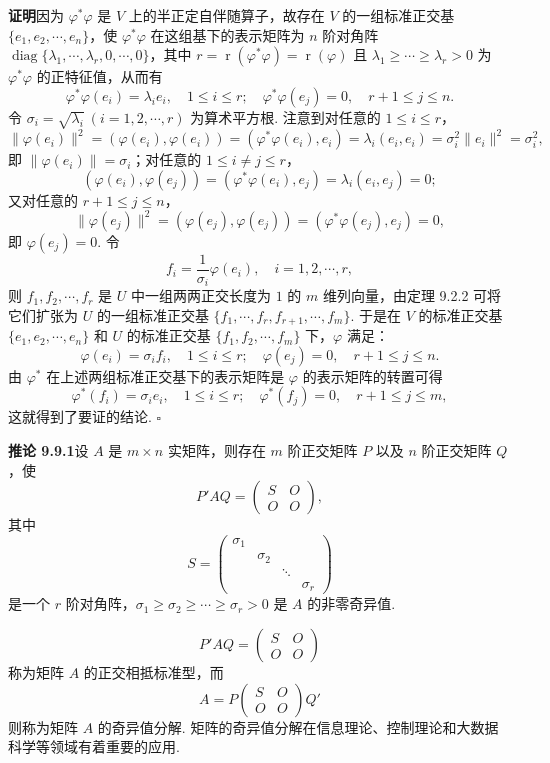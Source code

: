 \documentclass[UTF8,12pt,a4paper,fontset=fandol]{ctexart}
\begin{document}
\noindent\textbf{证明}\quad 因为 $\varphi^*\varphi$ 是 $V$ 上的半正定自伴随算子，故存在 $V$ 的一组标准正交基 $\{e_1,e_2,\cdots,e_n\}$，使 $\varphi^*\varphi$ 在这组基下的表示矩阵为 $n$ 阶对角阵 $\operatorname{diag}\{\lambda_1,\cdots,\lambda_r,0,\cdots,0\}$，其中 $r=\operatorname{r}(\varphi^*\varphi)=\operatorname{r}(\varphi)$ 且 $\lambda_1\ge\cdots\ge\lambda_r>0$ 为 $\varphi^*\varphi$ 的正特征值，从而有
\[
  \varphi^*\varphi(e_i)=\lambda_ie_i,\quad 1\le i\le r;\quad
  \varphi^*\varphi(e_j)=0,\quad r+1\le j\le n.
\]
令 $\sigma_i=\sqrt{\lambda_i}\ (i=1,2,\cdots,r)$ 为算术平方根. 注意到对任意的 $1\le i\le r$，
\[
  \|\varphi(e_i)\|^2=(\varphi(e_i),\varphi(e_i))=(\varphi^*\varphi(e_i),e_i)=\lambda_i(e_i,e_i)=\sigma_i^2\|e_i\|^2=\sigma_i^2,
\]
即 $\|\varphi(e_i)\|=\sigma_i$；对任意的 $1\le i\ne j\le r$，
\[
  (\varphi(e_i),\varphi(e_j))=(\varphi^*\varphi(e_i),e_j)=\lambda_i(e_i,e_j)=0;
\]
又对任意的 $r+1\le j\le n$，
\[
  \|\varphi(e_j)\|^2=(\varphi(e_j),\varphi(e_j))=(\varphi^*\varphi(e_j),e_j)=0,
\]
即 $\varphi(e_j)=0$. 令
\[
  f_i=\frac1{\sigma_i}\varphi(e_i),\quad i=1,2,\cdots,r,
\]
则 $f_1,f_2,\cdots,f_r$ 是 $U$ 中一组两两正交长度为 $1$ 的 $m$ 维列向量，由定理 9.2.2 可将它们扩张为 $U$ 的一组标准正交基 $\{f_1,\cdots,f_r,f_{r+1},\cdots,f_m\}$. 于是在 $V$ 的标准正交基 $\{e_1,e_2,\cdots,e_n\}$ 和 $U$ 的标准正交基 $\{f_1,f_2,\cdots,f_m\}$ 下，$\varphi$ 满足：
\[
  \varphi(e_i)=\sigma_if_i,\quad 1\le i\le r;\quad \varphi(e_j)=0,\quad r+1\le j\le n.
\]
由 $\varphi^*$ 在上述两组标准正交基下的表示矩阵是 $\varphi$ 的表示矩阵的转置可得
\[
  \varphi^*(f_i)=\sigma_ie_i,\quad 1\le i\le r;\quad \varphi^*(f_j)=0,\quad r+1\le j\le m,
\]
这就得到了要证的结论. $\square$

\noindent\textbf{推论 9.9.1}\quad 设 $A$ 是 $m\times n$ 实矩阵，则存在 $m$ 阶正交矩阵 $P$ 以及 $n$ 阶正交矩阵 $Q$，使
\[
  P'AQ=
  \left(\begin{array}{cc}
    S & O\\
    O & O
  \end{array}\right),
\]
其中
\[
  S=
  \left(\begin{array}{cccc}
    \sigma_1 & & &\\
    & \sigma_2 & &\\
    & & \ddots &\\
    & & & \sigma_r
  \end{array}\right)
\]
是一个 $r$ 阶对角阵，$\sigma_1\ge\sigma_2\ge\cdots\ge\sigma_r>0$ 是 $A$ 的非零奇异值.

\[
  P'AQ=
  \left(\begin{array}{cc}
    S & O\\
    O & O
  \end{array}\right)
\]
称为矩阵 $A$ 的正交相抵标准型，而
\[
  A=P
  \left(\begin{array}{cc}
    S & O\\
    O & O
  \end{array}\right)
  Q'
\]
则称为矩阵 $A$ 的奇异值分解. 矩阵的奇异值分解在信息理论、控制理论和大数据科学等领域有着重要的应用.
\end{document}
